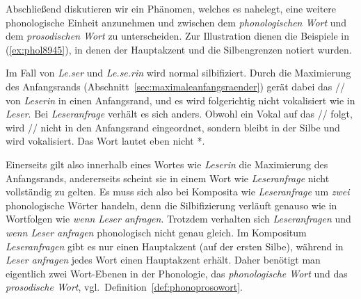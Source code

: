 \label{sec:prosodischewoerter}

Abschließend diskutieren wir ein Phänomen, welches es nahelegt, eine weitere phonologische Einheit anzunehmen und zwischen dem \textit{phonologischen Wort} und dem \textit{prosodischen Wort} zu unterscheiden.
Zur Illustration dienen die Beispiele in (\ref{ex:phol8945}), in denen der Hauptakzent und die Silbengrenzen notiert wurden.

\begin{exe}
  \ex\label{ex:phol8945}
  \begin{xlist}
  \end{xlist}
\end{exe}

Im Fall von \textit{Le.ser} und \textit{Le.se.rin} wird normal silbifiziert.
Durch die Maximierung des Anfangsrands (Abschnitt~\ref{sec:maximaleanfangsraender}) gerät dabei das // von \textit{Leserin} in einen Anfangsrand, und es wird folgerichtig nicht vokalisiert wie in \textit{Leser}.
Bei \textit{Leseranfrage} verhält es sich anders.
Obwohl ein Vokal auf das // folgt, wird // nicht in den Anfangsrand eingeordnet, sondern bleibt in der Silbe \textipa{[z5]} und wird vokalisiert.
Das Wort lautet eben nicht *.

Einerseits gilt also innerhalb eines Wortes wie \textit{Leserin} die Maximierung des Anfangsrands, andererseits scheint sie in einem Wort wie \textit{Leseranfrage} nicht vollständig zu gelten.
Es muss sich also bei Komposita wie \textit{Leseranfrage} um \textit{zwei} phonologische Wörter handeln, denn die Silbifizierung verläuft genauso wie in Wortfolgen wie \textit{wenn Leser anfragen}.
Trotzdem verhalten sich \textit{Leseranfragen} und \textit{wenn Leser anfragen} phonologisch nicht genau gleich.
Im Kompositum \textit{Leseranfragen} gibt es nur einen Hauptakzent (auf der ersten Silbe), während in \textit{Leser anfragen} jedes Wort einen Hauptakzent erhält.
Daher benötigt man eigentlich zwei Wort-Ebenen in der Phonologie, das \textit{phonologische Wort} und das \textit{prosodische Wort}, vgl.\ Definition~\ref{def:phonoprosowort}.



